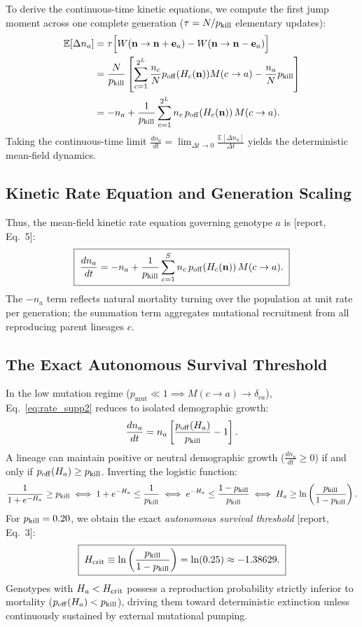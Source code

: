 \documentclass[11pt,a4paper]{article}
\newcommand{\pk}{p_{\rm kill}}
\newcommand{\poff}{p_{\rm off}}
\newcommand{\Hc}{H_{\rm crit}}
\newcommand{\R}[1]{\textcolor{blue!55!black}{[report, #1]}}
\begin{document}
To derive the continuous-time kinetic equations, we compute the first jump moment across one complete generation ($\tau = N / \pk$ elementary updates):
\begin{align}
\mathbb{E}[\Delta n_a] &= \tau \Big[ W(\mathbf{n} \to \mathbf{n} + \mathbf{e}_a) - W(\mathbf{n} \to \mathbf{n} - \mathbf{e}_a) \Big] \nonumber \\
&= \frac{N}{\pk} \left[ \sum_{c=1}^{2^L} \frac{n_c}{N} \poff(H_c(\mathbf{n})) M(c \to a) - \frac{n_a}{N} \pk \right] \nonumber \\
&= -n_a + \frac{1}{\pk} \sum_{c=1}^{2^L} n_c \, \poff(H_c(\mathbf{n})) \, M(c \to a).
\end{align}
Taking the continuous-time limit $\frac{dn_a}{dt} = \lim_{\Delta t \to 0} \frac{\mathbb{E}[\Delta n_a]}{\Delta t}$ yields the deterministic mean-field dynamics.

\subsection{Kinetic Rate Equation and Generation Scaling}

Thus, the mean-field kinetic rate equation governing genotype $a$ is \R{Eq.~5}:
\begin{equation}
\boxed{\;\frac{dn_a}{dt} = -n_a + \frac{1}{\pk} \sum_{c=1}^S n_c \, \poff(H_c(\mathbf{n})) \, M(c \to a).\;}
\label{eq:rate_supp2}
\end{equation}
The $-n_a$ term reflects natural mortality turning over the population at unit rate per generation; the summation term aggregates mutational recruitment from all reproducing parent lineages $c$.

\subsection{The Exact Autonomous Survival Threshold}
\label{sec:Hcrit}

In the low mutation regime ($p_{\text{mut}}\ll 1 \implies M(c \to a) \to \delta_{ca}$), Eq.~\eqref{eq:rate_supp2} reduces to isolated demographic growth:
\begin{equation}
\frac{dn_a}{dt} = n_a \left[ \frac{\poff(H_a)}{\pk} - 1 \right].
\end{equation}
A lineage can maintain positive or neutral demographic growth ($\frac{dn_a}{dt} \ge 0$) if and only if $\poff(H_a) \ge \pk$. Inverting the logistic function:
\begin{equation}
\frac{1}{1 + e^{-H_a}} \ge \pk \iff 1 + e^{-H_a} \le \frac{1}{\pk} \iff e^{-H_a} \le \frac{1 - \pk}{\pk} \iff H_a \ge \ln\left( \frac{\pk}{1 - \pk} \right).
\end{equation}
For $\pk = 0.20$, we obtain the exact \textit{autonomous survival threshold} \R{Eq.~3}:
\begin{equation}
\boxed{\;\Hc \equiv \ln\left( \frac{\pk}{1 - \pk} \right) = \ln(0.25) \approx -1.38629.\;}
\label{eq:Hcrit_supp2}
\end{equation}
Genotypes with $H_a < \Hc$ possess a reproduction probability strictly inferior to mortality ($\poff(H_a) < \pk$), driving them toward deterministic extinction unless continuously sustained by external mutational pumping.
\end{document}

